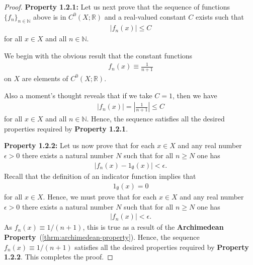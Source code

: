 \begin{proof}
\textbf{Property 1.2.1:} Let us next prove that the sequence of functions $\{ f_n \}_{n \in \mathbb{N}}$ above is in $C^0(X; \mathbb{R})$ and a real-valued constant $C$ exists such that
\begin{align}
    \lvert f_n(x) \rvert \le C
\end{align}
for all $x \in X$ and all $n \in \mathbb{N}$.

We begin with the obvious result that the constant functions
\begin{align}
    f_n(x) \equiv \frac{1}{n + 1}
\end{align}
on $X$ are elements of $C^0(X; \mathbb{R})$.

Also a moment's thought reveals that if we take $C = 1$, then we have
\begin{align}
    \lvert f_n(x) \rvert = \left\lvert \frac{1}{n + 1} \right\rvert \le C
\end{align}
for all $x \in X$ and all $n \in \mathbb{N}$. Hence, the sequence satisfies all the desired properties required by \textbf{Property 1.2.1}.

\textbf{Property 1.2.2:} Let us now prove that for each $x \in X$ and any real number $\epsilon > 0$ there exists a natural number $N$ such that for all $n \ge N$ one has
\begin{align}
    \lvert f_n(x) - 1_\emptyset(x) \rvert < \epsilon.
\end{align}
Recall that the definition of an indicator function implies that
\begin{align}
    1_\emptyset(x) = 0
\end{align}
for all $x \in X$. Hence, we must prove that for each $x \in X$ and any real number $\epsilon > 0$ there exists a natural number $N$ such that for all $n \ge N$ one has
\begin{align}
    \lvert f_n(x) \rvert < \epsilon.
\end{align}
As $f_n(x) \equiv 1 / (n + 1)$, this is true as a result of the \textbf{Archimedean Property}~(\ref{thrm:archimedean-property}). Hence, the sequence $f_n(x) \equiv 1 / (n + 1)$ satisfies all the desired properties required by \textbf{Property 1.2.2}. This completes the proof.
\end{proof}

